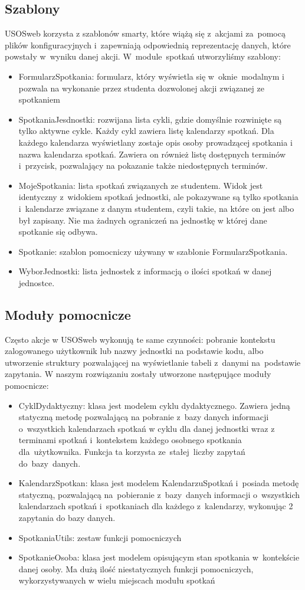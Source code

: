 \documentclass[licencjacka]{pracamgr}
\begin{document}
\subsection{Szablony}
USOSweb korzysta z szablonów smarty, które wiążą się z~akcjami za~pomocą plików konfiguracyjnych i~zapewniają odpowiednią reprezentację danych, które powstały w~wyniku danej akcji. W~module~spotkań utworzyliśmy szablony:
\begin{itemize}
\item{FormularzSpotkania: formularz, który wyświetla się w~oknie~modalnym i pozwala na wykonanie przez studenta dozwolonej akcji związanej ze spotkaniem}
\item{SpotkaniaJesdnostki: rozwijana lista cykli, gdzie domyślnie rozwinięte są tylko aktywne cykle. Każdy cykl zawiera listę kalendarzy spotkań. Dla każdego kalendarza wyświetlany zostaje opis osoby prowadzącej spotkania i nazwa kalendarza spotkań. Zawiera on również listę dostępnych terminów i~przycisk, pozwalający na pokazanie także niedostępnych terminów.}
\item{MojeSpotkania: lista spotkań związanych ze studentem. Widok jest identyczny z~widokiem spotkań jednostki, ale pokazywane są tylko spotkania i~kalendarze związane z danym studentem, czyli takie, na które on jest albo był zapisany. Nie ma żadnych ograniczeń na jednostkę w której dane spotkanie się odbywa.}
\item{Spotkanie: szablon pomocniczy używany w szablonie FormularzSpotkania.}
\item{WyborJednostki: lista jednostek z informacją o ilości spotkań w danej jednostce.}
\end{itemize}
\subsection{Moduły pomocnicze}
Często akcje w USOSweb wykonują te same czynności: pobranie kontekstu zalogowanego użytkownik lub nazwy jednostki na podstawie kodu, albo utworzenie struktury pozwalającej na wyświetlanie tabeli z~danymi na~podstawie zapytania.
W naszym rozwiązaniu zostały utworzone następujące moduły pomocnicze:
\begin{itemize}
\item{CyklDydaktyczny: klasa jest modelem cyklu dydaktycznego. Zawiera jedną statyczną metodę pozwalającą na pobranie z~bazy danych informacji o~wszystkich kalendarzach spotkań w cyklu dla danej jednostki wraz z terminami spotkań i~kontekstem każdego osobnego spotkania dla~użytkownika. Funkcja ta korzysta ze~stałej~liczby zapytań do~bazy~danych.}
\item{KalendarzSpotkan: klasa jest modelem KalendarzuSpotkań i~posiada metodę statyczną, pozwalającą na~pobieranie z~bazy~danych informacji o~wszystkich kalendarzach spotkań i~spotkaniach dla każdego z~kalendarzy, wykonując 2 zapytania do bazy danych.}
\item{SpotkaniaUtils: zestaw funkcji pomocniczych}
\item{SpotkanieOsoba: klasa jest modelem opisującym stan spotkania w~kontekście danej osoby. Ma dużą ilość niestatycznych funkcji pomocniczych, wykorzystywanych w wielu miejscach modułu spotkań}
\end{itemize}
\end{document}
